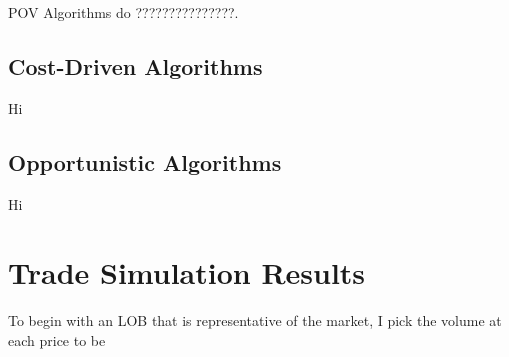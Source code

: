POV Algorithms do ???????????????.

\subsection{Cost-Driven Algorithms}
Hi

\subsection{Opportunistic Algorithms}
Hi



\section{Trade Simulation Results} \label{ch:sim_results}
To begin with an LOB that is representative of the market, I pick the volume at each price to be 